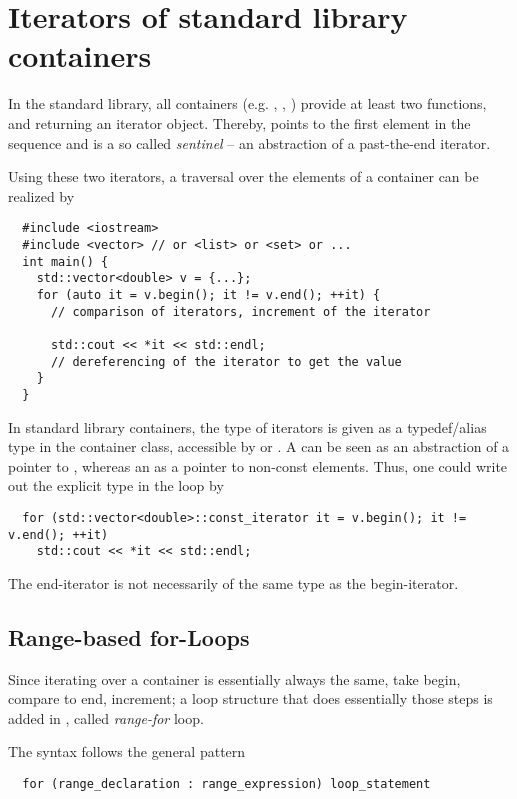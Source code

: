 \section{Iterators of standard library containers}
In the standard library, all containers (e.g. , , ) provide at least two functions,  and 
returning an iterator object. Thereby,  points to the first element in the sequence and  is a so called \emph{sentinel} -- an abstraction of a past-the-end iterator.

Using these two iterators, a traversal over the elements of a container can be realized by
%
\begin{verbatim}
  #include <iostream>
  #include <vector> // or <list> or <set> or ...
  int main() {
    std::vector<double> v = {...};
    for (auto it = v.begin(); it != v.end(); ++it) {
      // comparison of iterators, increment of the iterator

      std::cout << *it << std::endl;
      // dereferencing of the iterator to get the value
    }
  }
\end{verbatim}

In standard library containers, the type of iterators is given as a typedef/alias type in the container class, accessible by  or
. A  can be seen as an abstraction of a pointer to , whereas an  as a pointer to
non-const elements. Thus, one could write out the explicit type in the loop by
%
\begin{verbatim}
  for (std::vector<double>::const_iterator it = v.begin(); it != v.end(); ++it)
    std::cout << *it << std::endl;
\end{verbatim}

The\marginpar{[]\cxx{17}]} end-iterator is not necessarily of the same type as the begin-iterator.

\subsection{Range-based for-Loops}
Since iterating over a container is essentially always the same, take begin, compare to end, increment; a loop structure that does essentially
those steps is added in , called \emph{range-for} loop.

The syntax follows the general pattern
\begin{verbatim}
  for (range_declaration : range_expression) loop_statement
\end{verbatim}

